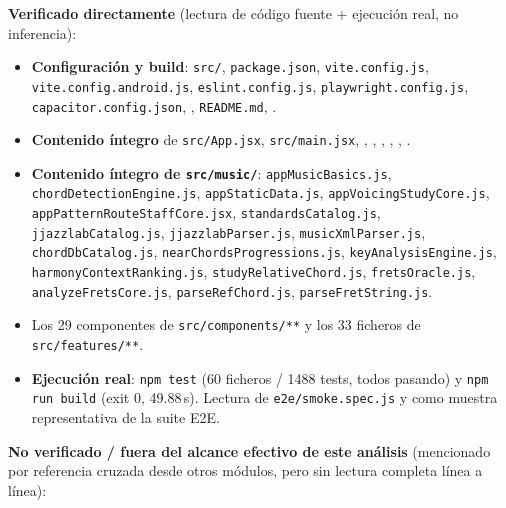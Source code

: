 \documentclass[a4paper,11pt,oneside]{report}
\begin{document}
\begin{notabox}
\small
\textbf{Verificado directamente} (lectura de código fuente + ejecución real, no inferencia):

\begin{itemize}[itemsep=1pt,topsep=3pt]
\item \textbf{Configuración y build}: \lstinline!src/!, \lstinline!package.json!, \lstinline!vite.config.js!, \lstinline!vite.config.android.js!, \lstinline!eslint.config.js!, \lstinline!playwright.config.js!, \lstinline!capacitor.config.json!, \texttt{}, \lstinline!README.md!, \texttt{}.
\item \textbf{Contenido íntegro} de \lstinline!src/App.jsx!, \lstinline!src/main.jsx!, \texttt{}, \texttt{}, \texttt{}, \texttt{}, \texttt{}, \texttt{}.
\item \textbf{Contenido íntegro de \lstinline!src/music/!}: \lstinline!appMusicBasics.js!, \lstinline!chordDetectionEngine.js!, \lstinline!appStaticData.js!, \lstinline!appVoicingStudyCore.js!, \lstinline!appPatternRouteStaffCore.jsx!, \lstinline!standardsCatalog.js!, \lstinline!jjazzlabCatalog.js!, \lstinline!jjazzlabParser.js!, \lstinline!musicXmlParser.js!, \lstinline!chordDbCatalog.js!, \lstinline!nearChordsProgressions.js!, \lstinline!keyAnalysisEngine.js!, \lstinline!harmonyContextRanking.js!, \lstinline!studyRelativeChord.js!, \lstinline!fretsOracle.js!, \lstinline!analyzeFretsCore.js!, \lstinline!parseRefChord.js!, \lstinline!parseFretString.js!.
\item Los 29 componentes de \lstinline!src/components/**! y los 33 ficheros de \lstinline!src/features/**!.
\item \textbf{Ejecución real}: \lstinline!npm test! (60 ficheros / 1488 tests, todos pasando) y \lstinline!npm run build! (exit 0, 49.88\,s). Lectura de \lstinline!e2e/smoke.spec.js! y \texttt{} como muestra representativa de la suite E2E.
\end{itemize}
\end{notabox}

\begingroup
\small
\textbf{No verificado / fuera del alcance efectivo de este análisis} (mencionado por referencia cruzada desde otros módulos, pero sin lectura completa línea a línea):
\end{document}
